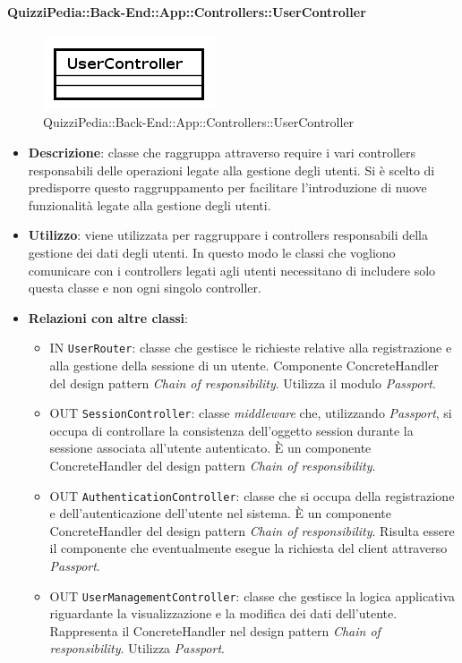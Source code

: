 \paragraph{QuizziPedia::Back-End::App::Controllers::UserController}
\label{QuizziPedia::Back-End::App::Controllers::UserController}
\begin{figure}[ht]
	\centering
	\includegraphics[scale=0.45]{UML/Classi/Back-End/QuizziPedia_Back-End_App_Controllers_UserController.png}
	\caption{QuizziPedia::Back-End::App::Controllers::UserController}
\end{figure}
\FloatBarrier
\begin{itemize}
	\item 
	\textbf{Descrizione}:
	classe che raggruppa attraverso require i vari controllers responsabili delle operazioni legate alla gestione degli utenti. Si è scelto di predisporre questo raggruppamento per facilitare l'introduzione di nuove funzionalità legate alla gestione degli utenti.
	\item \textbf{Utilizzo}:
	viene utilizzata per raggruppare i controllers responsabili della gestione dei dati degli utenti. In questo modo le classi che vogliono comunicare con i controllers legati agli utenti necessitano di includere solo questa classe e non ogni singolo controller.
	\item \textbf{Relazioni con altre classi}:
	\begin{itemize}
		\item 
			IN	\texttt{UserRouter}: 
			classe che gestisce le richieste relative alla registrazione e alla gestione della sessione di un utente. Componente ConcreteHandler del design pattern \textit{Chain of responsibility}. Utilizza il modulo \textit{Passport}.		
		\item 
			OUT \texttt{SessionController}:
			classe \textit{middleware} che, utilizzando \textit{Passport}, si occupa di controllare la consistenza dell'oggetto session durante la sessione associata all'utente autenticato. È un componente ConcreteHandler del design pattern \textit{Chain of responsibility}.
		\item 
			OUT \texttt{AuthenticationController}:
			classe che si occupa della registrazione e dell'autenticazione dell'utente nel sistema. È un componente ConcreteHandler del design pattern \textit{Chain of responsibility}. Risulta essere il componente che eventualmente esegue la richiesta del client attraverso \textit{Passport}.	
		\item 
			OUT \texttt{UserManagementController}:
			classe che gestisce la logica applicativa riguardante la visualizzazione e la modifica dei dati dell'utente.
			Rappresenta il ConcreteHandler nel design pattern \textit{Chain of responsibility}. Utilizza \textit{Passport}.
	\end{itemize}
\end{itemize}
